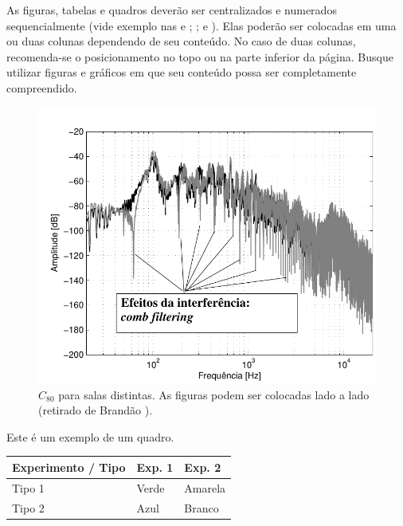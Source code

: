As figuras, tabelas e quadros deverão ser centralizados e numerados sequencialmente (vide exemplo nas  e ; ;  e ). Elas poderão ser colocadas em uma ou duas colunas dependendo de seu conteúdo. No caso de duas colunas, recomenda-se o posicionamento no topo ou na parte inferior da página. Busque utilizar figuras e gráficos em que seu conteúdo possa ser completamente compreendido. 

\begin{figure}[H]
	\centering \vspace{-3mm}
        \includegraphics[width=0.96\linewidth,page=1]{Figuras/Combfilter-Brandao-2017.pdf}
        \caption{$C_{80}$ para salas distintas. As figuras podem ser colocadas lado a lado (retirado de Brandão \cite{Brandao-2017}).}
	\label{fig:C80}%
\end{figure}

\begin{quadro}[H]
  \centering {} \setlength\aboverulesep{0pt} \setlength\belowrulesep{0pt}
  \caption{Este é um exemplo de um quadro.}
	\fontsize{11}{12}\selectfont 
    \begin{tabular}{| C{2.8cm} | C{1.8cm} | C{1.8cm} |}
    \hline
    \textbf{ Experimento / Tipo } & \textbf{Exp. 1} & \textbf{Exp. 2}\\
	  \midrule
		Tipo 1& Verde & Amarela\\
		 Tipo 2 & Azul & Branco\\
		\hline
    \end{tabular}
    \label{quad.exemplo}%
		\vspace{-0.5mm}
\end{quadro}%


